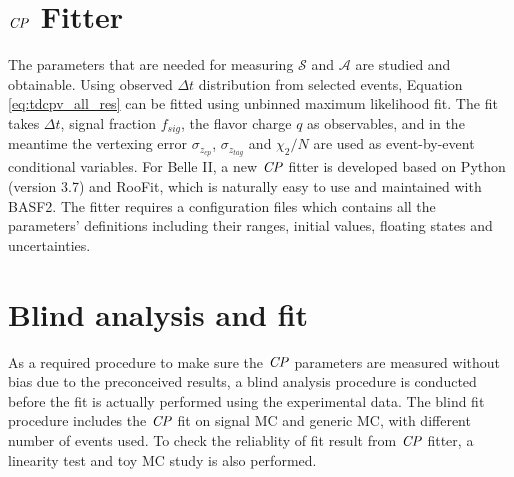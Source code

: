 \section{$\it{CP}$ Fitter}

The parameters that are needed for measuring $\mathcal{S}$ and $\mathcal{A}$ are studied and obtainable. Using observed $\Delta t$ distribution from selected events, Equation \ref{eq:tdcpv_all_res} can be fitted using unbinned maximum likelihood fit. The fit takes $\Delta t$, signal fraction $f_{sig}$, the flavor charge $q$ as observables, and in the meantime the vertexing error $\sigma_{z_{cp}}$, $\sigma_{z_{tag}}$ and $\chi_2/N$ are used as event-by-event conditional variables.
For Belle II, a new $\it{CP}$ fitter is developed based on Python (version 3.7) and RooFit, which is naturally easy to use and maintained with BASF2. The fitter requires a configuration files which contains all the parameters' definitions including their ranges, initial values, floating states and uncertainties. 

\section{Blind analysis and fit}
As a required procedure to make sure the $\it{CP}$ parameters are measured without bias due to the preconceived results, a blind analysis procedure is conducted before the fit is actually performed using the experimental data. The blind fit procedure includes the $\it{CP}$ fit on signal MC and generic MC, with different number of events used. To check the reliablity of fit result from $\it{CP}$ fitter, a linearity test and toy MC study is also performed. 

